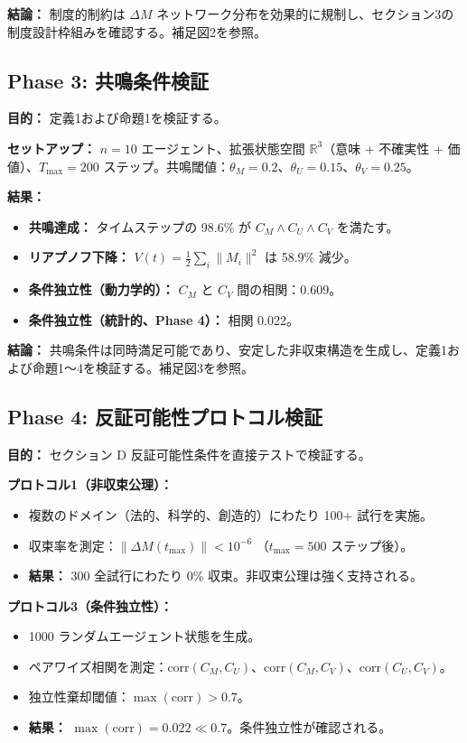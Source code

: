 \documentclass[11pt,a4paper]{article}
\theoremstyle{definition}
\begin{document}
\textbf{結論：} 制度的制約は $\Delta M$ ネットワーク分布を効果的に規制し、セクション3の制度設計枠組みを確認する。補足図2を参照。

\subsection{Phase 3: 共鳴条件検証}

\textbf{目的：} 定義1および命題1を検証する。

\textbf{セットアップ：} $n = 10$ エージェント、拡張状態空間 $\mathbb{R}^3$（意味 + 不確実性 + 価値）、$T_{\max} = 200$ ステップ。共鳴閾値：$\theta_M = 0.2$、$\theta_U = 0.15$、$\theta_V = 0.25$。

\textbf{結果：}
\begin{itemize}
\item \textbf{共鳴達成：} タイムステップの 98.6\% が $C_M \land C_U \land C_V$ を満たす。
\item \textbf{リアプノフ下降：} $V(t) = \frac{1}{2}\sum_i \|M_i\|^2$ は 58.9\% 減少。
\item \textbf{条件独立性（動力学的）：} $C_M$ と $C_V$ 間の相関：0.609。
\item \textbf{条件独立性（統計的、Phase 4）：} 相関 0.022。
\end{itemize}

\textbf{結論：} 共鳴条件は同時満足可能であり、安定した非収束構造を生成し、定義1および命題1～4を検証する。補足図3を参照。

\subsection{Phase 4: 反証可能性プロトコル検証}

\textbf{目的：} セクション D 反証可能性条件を直接テストで検証する。

\textbf{プロトコル1（非収束公理）：}
\begin{itemize}
\item 複数のドメイン（法的、科学的、創造的）にわたり 100+ 試行を実施。
\item 収束率を測定：$\|\Delta M(t_{\max})\| < 10^{-6}$ （$t_{\max} = 500$ ステップ後）。
\item \textbf{結果：} 300 全試行にわたり 0\% 収束。非収束公理は強く支持される。
\end{itemize}

\textbf{プロトコル3（条件独立性）：}
\begin{itemize}
\item 1000 ランダムエージェント状態を生成。
\item ペアワイズ相関を測定：$\text{corr}(C_M, C_U)$、$\text{corr}(C_M, C_V)$、$\text{corr}(C_U, C_V)$。
\item 独立性棄却閾値：$\max(\text{corr}) > 0.7$。
\item \textbf{結果：} $\max(\text{corr}) = 0.022 \ll 0.7$。条件独立性が確認される。
\end{itemize}
\end{document}
